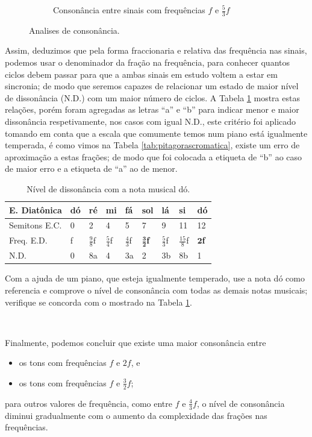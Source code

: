 \begin{figure}
\begin{subfigure}[b]{0.8\textwidth}
        \caption{Consonância entre sinais com frequências $f$ e $\frac{5}{3}f$}
        \label{fig:corda53}
    \end{subfigure}
\caption{Analises de consonância.}
\label{fig:consonanciaper}
\end{figure}

Assim, deduzimos que pela forma fraccionaria e relativa das frequência nas sinais, 
podemos usar o denominador da fração na frequência,
para conhecer quantos ciclos debem passar para que a ambas sinais em estudo voltem a estar em sincronia;
de modo que seremos capazes de relacionar um estado de maior nível de dissonância (N.D.) com um maior número de ciclos.
A Tabela \ref{tab:pitagorascromatica2} mostra estas relações, 
porém foram agregadas as letras ``a'' e ``b'' para indicar menor e maior dissonância respetivamente,
nos casos com igual N.D., este critério foi aplicado tomando em conta que a escala
que comumente temos num piano está igualmente temperada,
é como vimos na Tabela  \ref{tab:pitagorascromatica},
existe um erro de aproximação a estas frações;
de modo que foi colocada a etiqueta de ``b'' ao caso de maior erro e a etiqueta de ``a'' ao de menor.
\begin{table}[h]
  \centering
  \begin{tabular}{|l|l|l|l|l|l|l|l|l|}
  \hline
  E. Diatônica    & dó & ré & mi & fá & sol & lá & si & dó \\ \hline
  \hline
  Semitons E.C.   & 0  & 2  & 4  & 5  & 7  & 9  & 11 & 12 \\ \hline
  Freq. E.D.  & f  & $\frac{9}{8}$f & $\frac{5}{4}$f & $\frac{4}{3}$f & $\mathbf{\frac{3}{2}}$\textbf{f} & $\frac{5}{3}$f & $\frac{15}{8}$f & $\mathbf{2}$\textbf{f}\\ \hline \hline
  N.D. &  0 & 8a & 4 & 3a & 2 & 3b & 8b & 1 \\ \hline
  \end{tabular}
  \caption{Nível de dissonância com a nota musical dó.}
  \label{tab:pitagorascromatica2}
\end{table}

\begin{example}
Com a ajuda de um piano, que esteja igualmente temperado,
use a nota dó como referencia e comprove o nível de consonância com todas as demais notas musicais;
verifique se concorda com o mostrado na Tabela \ref{tab:pitagorascromatica2}.
\end{example}~


Finalmente, podemos concluir que existe uma maior consonância entre
\begin{itemize} 
\item os tons com frequências $f$ e $2f$, e 
\item os tons com frequências $f$ e $\frac{3}{2}f$;
\end{itemize}
para outros valores de frequência, 
como entre $f$ e $\frac{4}{3}f$, o nível de consonância diminui  
 gradualmente com o aumento da complexidade das frações nas frequências.

